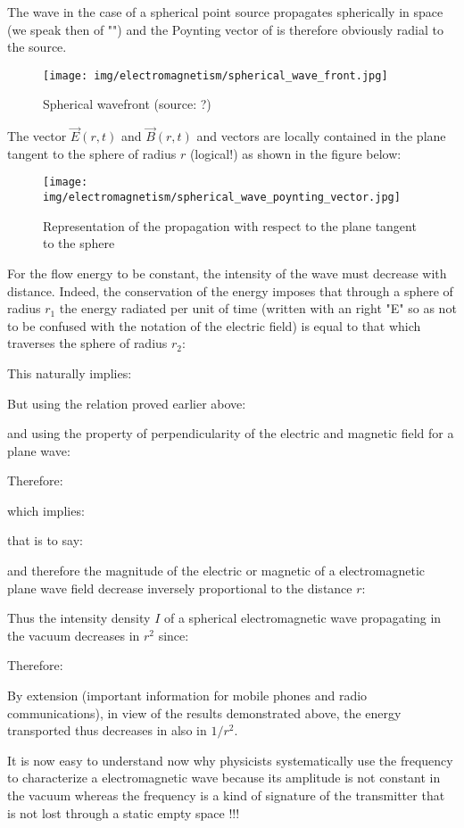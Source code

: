 	The wave in the case of a spherical point source propagates spherically in space (we speak then of "\label{spherical wave}") and the Poynting vector of is therefore obviously radial to the source.
	\begin{figure}[H]
		\centering
		\texttt{[image: img/electromagnetism/spherical\_wave\_front.jpg]}
		\caption[Spherical wavefront]{Spherical wavefront (source: ?)}
	\end{figure}
	The vector $\vec{E}(r,t)$ and $\vec{B}(r,t)$ and vectors are locally contained in the plane tangent to the sphere of radius $r$ (logical!) as shown in the figure below:
	\begin{figure}[H]
		\centering
		\texttt{[image: img/electromagnetism/spherical\_wave\_poynting\_vector.jpg]}
		\caption[]{Representation of the propagation with respect to the plane tangent to the sphere}
	\end{figure}
	For the flow energy to be constant, the intensity of the wave must decrease with distance. Indeed, the conservation of the energy imposes that through a sphere of radius $r_1$ the energy radiated per unit of time (written with an right "E" so as not to be confused with the notation of the electric field) is equal to that which traverses the sphere of radius $r_2$:
	
	This naturally implies:
	
	But using the relation proved earlier above:
	
	and using the property of perpendicularity of the electric and magnetic field for a plane wave:
	
	Therefore:
	
	which implies:
	
	that is to say:
	
	and therefore the magnitude of the electric or magnetic of a electromagnetic plane wave field decrease inversely proportional to the distance $r$:
	
	Thus the intensity density $I$ of a spherical electromagnetic wave propagating in the vacuum decreases in $r^2$ since:
	
	Therefore:
	
	By extension (important information for mobile phones and radio communications), in view of the results demonstrated above, the energy transported thus decreases in also in $1/r^2$.
	
	It is now easy to understand now why physicists systematically use the frequency to characterize a electromagnetic wave because its amplitude is not constant in the vacuum whereas the frequency is a kind of signature of the transmitter that is not lost through a static empty space !!!
	
